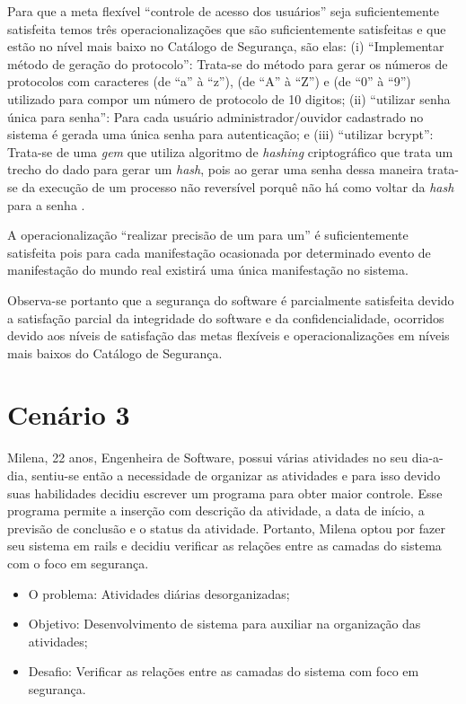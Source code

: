 Para que a meta flexível “controle de acesso dos usuários” seja suficientemente satisfeita temos três operacionalizações que são suficientemente satisfeitas e que estão no nível mais baixo no Catálogo de Segurança, são elas: (i) “Implementar método de geração do protocolo”: Trata-se do método para gerar os números de protocolos com caracteres (de “a” à “z”), (de “A” à “Z”) e (de “0” à “9”) utilizado para compor um número de protocolo de 10 digitos; (ii) “utilizar senha única para senha”: Para cada usuário administrador/ouvidor cadastrado no sistema é gerada uma única senha para autenticação; e (iii) “utilizar bcrypt”: Trata-se de uma \textit{gem} que utiliza algoritmo de \textit{hashing} criptográfico que trata um trecho do dado para gerar um \textit{hash}, pois ao gerar uma senha dessa maneira trata-se da execução de um processo não reversível porquê não há como voltar da \textit{hash} para a senha \cite{brcypt}.

A operacionalização “realizar precisão de um para um” é suficientemente satisfeita pois para cada manifestação ocasionada por determinado evento de manifestação do mundo real existirá uma única manifestação no sistema.

Observa-se portanto que a segurança do software é parcialmente satisfeita devido a satisfação parcial da integridade do software e da confidencialidade, ocorridos devido aos níveis de satisfação das metas flexíveis e operacionalizações em níveis mais baixos do Catálogo de Segurança. 

\section{Cenário 3}
\label{subsec:persona3}



Milena, 22 anos, Engenheira de Software, possui várias atividades no seu dia-a-dia, sentiu-se então a necessidade de organizar as atividades e para isso devido suas habilidades decidiu escrever um programa para obter maior controle. Esse programa permite a inserção com descrição da atividade, a data de início, a previsão de conclusão e o status da atividade. Portanto, Milena optou por fazer seu sistema em rails e decidiu verificar as relações entre as camadas do sistema com o foco em segurança.

\begin{itemize}
	\item O problema: Atividades diárias desorganizadas;
	\item Objetivo: Desenvolvimento de sistema para auxiliar na organização das atividades;
	\item Desafio: Verificar as relações entre as camadas do sistema com foco em segurança.
\end{itemize}

